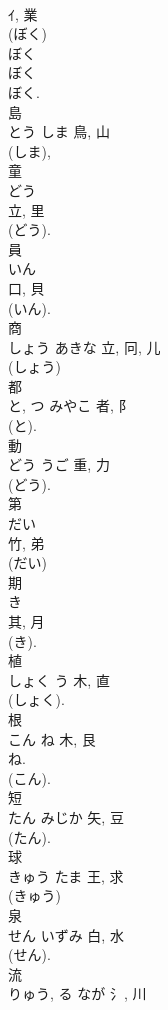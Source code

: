 \documentclass[8pt]{extreport}
\begin{document}
\begin{CJK}{UTF8}{min}
\\	ｲ, 業	
\\	(ぼく) 
\\	ぼく 
\\	ぼく 
\\	ぼく.	
\\	島	
\\	とう	しま	鳥, 山	
\\	(しま), 
\\	童	
\\	どう	
\\	立, 里	
\\	(どう). 
\\	員	
\\	いん	
\\	口, 貝	
\\	(いん). 
\\	商	
\\	しょう	あきな	立, 冋, 儿	
\\	(しょう) 
\\	都	
\\	と, つ	みやこ	者, 阝	
\\	(と). 
\\	動	
\\	どう	うご	重, 力	
\\	(どう). 
\\	第	
\\	だい	
\\	竹, 弟	
\\	(だい) 
\\	期	
\\	き	
\\	其, 月	
\\	(き). 
\\	植	
\\	しょく	う	木, 直	
\\	(しょく). 
\\	根	
\\	こん	ね	木, 艮	
\\	ね.	
\\	(こん). 
\\	短	
\\	たん	みじか	矢, 豆	
\\	(たん). 
\\	球	
\\	きゅう	たま	王, 求	
\\	(きゅう) 
\\	泉	
\\	せん	いずみ	白, 水	
\\	(せん). 
\\	流	
\\	りゅう, る	なが	氵, 川		

\end{CJK}
\end{document}
